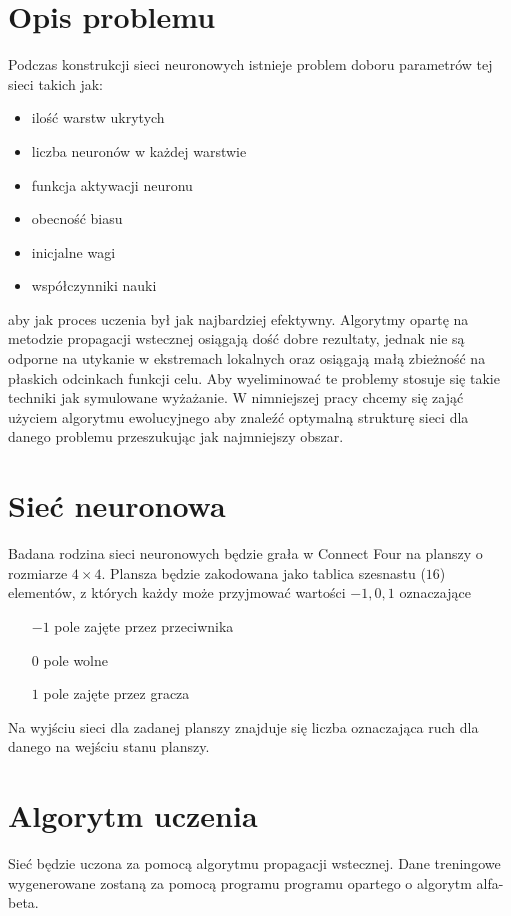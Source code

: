 \documentclass{llncs}
\begin{document}
\section{Opis problemu}
Podczas konstrukcji sieci neuronowych istnieje problem doboru parametrów tej sieci takich jak:
\begin{itemize}
	\item ilość warstw ukrytych
	\item liczba neuronów w każdej warstwie
	\item funkcja aktywacji neuronu
	\item obecność biasu
	\item inicjalne wagi
	\item współczynniki nauki
\end{itemize}
aby jak proces uczenia był jak najbardziej efektywny. Algorytmy opartę na metodzie propagacji wstecznej osiągają
dość dobre rezultaty, jednak nie są odporne na utykanie w ekstremach lokalnych oraz osiągają małą zbieżność
na płaskich odcinkach funkcji celu. Aby wyeliminować te problemy stosuje się takie techniki jak symulowane wyżażanie.
W nimniejszej pracy chcemy się zająć użyciem algorytmu ewolucyjnego aby znaleźć optymalną strukturę sieci
dla danego problemu przeszukując jak najmniejszy obszar.

\section{Sieć neuronowa}
Badana rodzina sieci neuronowych będzie grała w Connect Four na planszy o rozmiarze $4 \times 4$. Plansza będzie zakodowana
jako tablica szesnastu ($16$) elementów, z których każdy może przyjmować wartości $-1,0,1$ oznaczające
\begin{itemize}
	\item[$-1$] pole zajęte przez przeciwnika
	\item[$0$] pole wolne
	\item[$1$] pole zajęte przez gracza
\end{itemize}
Na wyjściu sieci dla zadanej planszy znajduje się liczba oznaczająca ruch dla danego na wejściu stanu planszy.

\section{Algorytm uczenia}
Sieć będzie uczona za pomocą algorytmu propagacji wstecznej. Dane treningowe wygenerowane zostaną za pomocą programu programu
opartego o algorytm alfa-beta.
\end{document}
